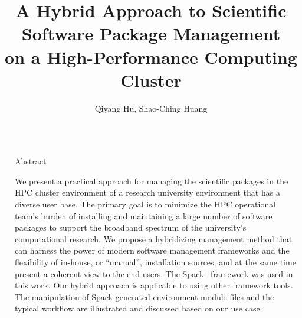\documentclass[final]{beamer}
\title{A Hybrid Approach to Scientific Software Package Management \\ on a High-Performance Computing Cluster} %
\author{Qiyang Hu, Shao-Ching Huang} %
\institute{Institute for Digital Research and Education, University of California, Los Angeles (UCLA)} %
\newlength{\sepwid}
\newlength{\onecolwid}
\begin{document}

\setlength{\belowcaptionskip}{2ex} %
\setlength\belowdisplayshortskip{2ex} %

\begin{frame}[t] %

\begin{columns}[t] %

\begin{column}{\sepwid}\end{column} %

\begin{column}{\onecolwid} %


\begin{alertblock}{Abstract}


We present a practical approach for managing the scientific packages in the HPC cluster environment of a research university environment that has a diverse user base.
The primary goal is to minimize the HPC operational team's burden of installing and maintaining a large number of software packages to support the broadband spectrum of the university's computational research.
We propose a hybridizing management method that can harness the power of modern software management frameworks and the flexibility of in-house, or ``manual'', installation sources, and at the same time present a coherent view to the end users. The Spack~\cite{gamblin:15} framework was used in this work. Our hybrid approach is applicable to using other framework tools. The manipulation of Spack-generated environment module files and the typical workflow are illustrated and discussed based on our use case.


\end{alertblock}
\end{column}
\end{columns}
\end{frame}
\end{document}

